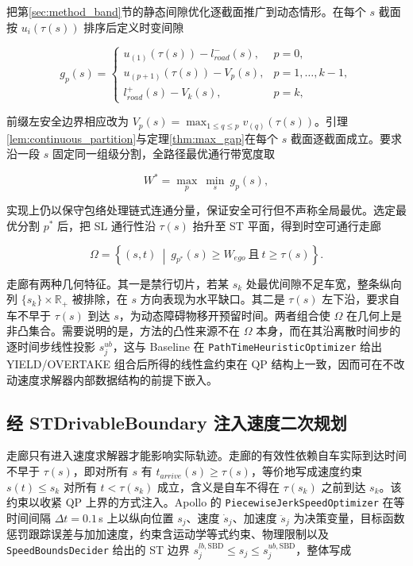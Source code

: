 \documentclass[a4paper,11pt]{ctexart}
\theoremstyle{definition}
\begin{document}
把第\ref{sec:method_band}节的静态间隙优化逐截面推广到动态情形。在每个 $s$ 截面按 $u_i(\tau(s))$ 排序后定义时变间隙

\begin{equation}
    g_p(s) =
    \begin{cases}
        u_{(1)}(\tau(s)) - l_{road}^{-}(s), & p=0, \\[0.3em]
        u_{(p+1)}(\tau(s)) - V_p(s), & p=1,\ldots,k-1, \\[0.3em]
        l_{road}^{+}(s) - V_k(s), & p=k,
    \end{cases}
    \label{eq:time_varying_gap}
\end{equation}

前缀左安全边界相应改为 $V_p(s)=\max_{1\leq q\leq p} v_{(q)}(\tau(s))$。引理\ref{lem:continuous_partition}与定理\ref{thm:max_gap}在每个 $s$ 截面逐截面成立。要求沿一段 $s$ 固定同一组级分割，全路径最优通行带宽度取

\begin{equation}
    W^{*} = \max_{p}\ \min_{s}\ g_p(s),
    \label{eq:time_varying_opt}
\end{equation}

实现上仍以保守包络处理链式连通分量，保证安全可行但不声称全局最优。选定最优分割 $p^{*}$ 后，把 SL 通行性沿 $\tau(s)$ 抬升至 ST 平面，得到时空可通行走廊

\begin{equation}
    \Omega = \left\{ (s,t) \ \middle|\ g_{p^{*}}(s) \geq W_{ego}\ \text{且}\ t \geq \tau(s) \right\}.
    \label{eq:st_corridor}
\end{equation}

走廊有两种几何特征。其一是禁行切片，若某 $s_k$ 处最优间隙不足车宽，整条纵向列 $\{s_k\}\times\mathbb{R}_{+}$ 被排除，在 $s$ 方向表现为水平缺口。其二是 $\tau(s)$ 左下沿，要求自车不早于 $\tau(s)$ 到达 $s$，为动态障碍物移开预留时间。两者组合使 $\Omega$ 在几何上是非凸集合。需要说明的是，方法的凸性来源不在 $\Omega$ 本身，而在其沿离散时间步的逐时间步线性投影 $s_j^{ub}$，这与 Baseline 在 \texttt{PathTimeHeuristicOptimizer} 给出 YIELD/OVERTAKE 组合后所得的线性盒约束在 QP 结构上一致，因而可在不改动速度求解器内部数据结构的前提下嵌入。

\subsection{经 STDrivableBoundary 注入速度二次规划}
\label{sec:method_inject}

走廊只有进入速度求解器才能影响实际轨迹。走廊的有效性依赖自车实际到达时间不早于 $\tau(s)$，即对所有 $s$ 有 $t_{arrive}(s)\geq\tau(s)$，等价地写成速度约束 $s(t)\leq s_k$ 对所有 $t<\tau(s_k)$ 成立，含义是自车不得在 $\tau(s_k)$ 之前到达 $s_k$。该约束以收紧 QP 上界的方式注入。Apollo 的 \texttt{PiecewiseJerkSpeedOptimizer} 在等时间间隔 $\Delta t = 0.1$\,s 上以纵向位置 $s_j$、速度 $\dot{s}_j$、加速度 $\ddot{s}_j$ 为决策变量，目标函数惩罚跟踪误差与加加速度，约束含运动学等式约束、物理限制以及 \texttt{SpeedBoundsDecider} 给出的 ST 边界 $s_j^{lb,\mathrm{SBD}} \leq s_j \leq s_j^{ub,\mathrm{SBD}}$，整体写成
\end{document}
